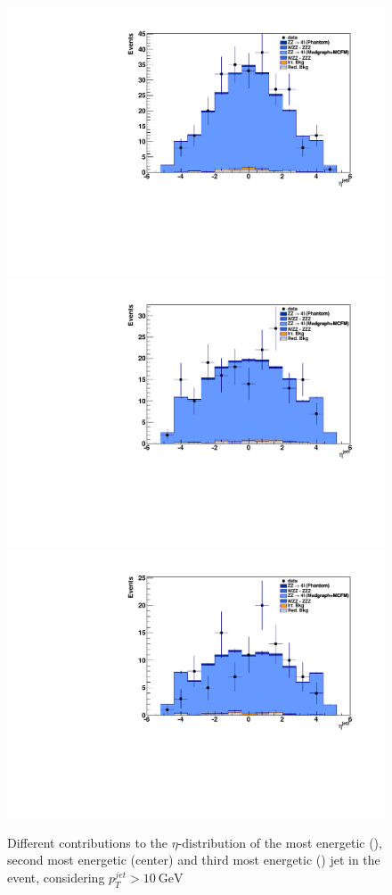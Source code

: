\begin{figure}[hbtp]
  \begin{center}
   \includegraphics[width=0.8\cmsFigWidth]{Figures/Eta0_mad}    
   \includegraphics[width=0.8\cmsFigWidth]{Figures/Eta1_mad}
   \includegraphics[width=0.8\cmsFigWidth]{Figures/Eta2_mad}
   \caption{Different contributions to the $\eta$-distribution of the most energetic (\cmsLeft), second most energetic (center) and third most energetic (\cmsRight) jet in the event, considering $p_T^{jet}> 10~\mathrm{GeV}$}
   \label{fig:eta_jets}
  \end{center}
\end{figure}
